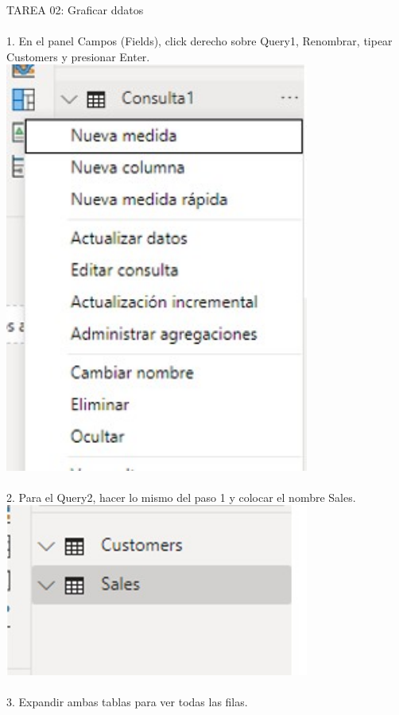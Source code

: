 \documentclass[preprint,12pt]{elsarticle}
\begin{document}
\begin{itemize}
		 	
		 		TAREA 02: Graficar ddatos \\ 
		 		\\ 1. En el panel Campos (Fields), click derecho sobre Query1, Renombrar, tipear Customers y presionar Enter.
		 		\\ \includegraphics[width=10cm]{./IMAGENES/2.1} \\
		 		\\ 2. Para el Query2, hacer lo mismo del paso 1 y colocar el nombre Sales.
		 		\\ \includegraphics[width=10cm]{./IMAGENES/2.2} \\
		 		\\ 3. Expandir ambas tablas para ver todas las filas.

\end{itemize}
\end{document}
